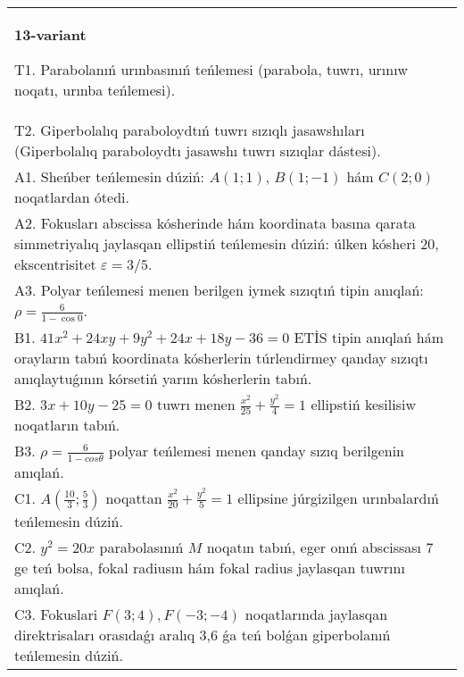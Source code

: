 \documentclass{article}
\begin{document}
\begin{tabular}{m{17cm}}
\textbf{13-variant}
\newline

T1. Parabolanıń urınbasınıń teńlemesi (parabola, tuwrı, urınıw noqatı, urınba teńlemesi).\\

T2. Giperbolalıq paraboloydtıń tuwrı sızıqlı jasawshıları (Giperbolalıq paraboloydtı jasawshı tuwrı sızıqlar dástesi).\\

A1. Sheńber teńlemesin dúziń: $A (1;1) $, $B (1;-1) $ hám $C (2;0) $ noqatlardan ótedi.\\

A2. Fokusları abscissa kósherinde hám koordinata basına qarata simmetriyalıq jaylasqan ellipstiń teńlemesin dúziń: úlken kósheri $20$, ekscentrisitet $\varepsilon=3/5$.\\

A3. Polyar teńlemesi menen berilgen iymek sızıqtıń tipin anıqlań: $\rho=\frac{6}{1-\cos 0}$.\\

B1. $41x^{2} + 24xy + 9y^{2} + 24x + 18y - 36 = 0$ ETİS tipin anıqlań hám orayların tabıń koordinata kósherlerin túrlendirmey qanday sızıqtı anıqlaytuǵının kórsetiń yarım kósherlerin tabıń.  \\

B2. $3x + 10y - 25 = 0$ tuwrı menen $\frac{x^{2}}{25} + \frac{y^{2}}{4} = 1$ ellipstiń kesilisiw noqatların tabıń.\\

B3. $\rho = \frac{6}{1 - cos\theta}$ polyar teńlemesi menen qanday sızıq berilgenin anıqlań.  \\

C1. $A(\frac{10}{3};\frac{5}{3})$ noqattan $\frac{x^{2}}{20} + \frac{y^{2}}{5} = 1$ ellipsine júrgizilgen urınbalardıń teńlemesin dúziń.  \\

C2. $y^{2} = 20x$ parabolasınıń $M$ noqatın tabıń, eger onıń abscissası 7 ge teń bolsa, fokal radiusın hám fokal radius jaylasqan tuwrını anıqlań.\\

C3. Fokuslari $F(3;4), F(-3;-4)$ noqatlarında jaylasqan direktrisaları orasıdaǵı aralıq 3,6 ǵa teń bolǵan giperbolanıń teńlemesin dúziń.  \\

\end{tabular}
\vspace{1cm}
\end{document}

